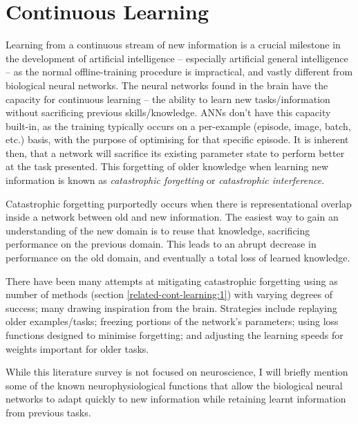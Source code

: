 \documentclass{report}
\begin{document}
	\section{Continuous Learning}
	Learning from a continuous stream of new information is a crucial milestone in the development of artificial intelligence -- especially artificial general intelligence -- as the normal offline-training procedure is impractical, and vastly different from biological neural networks. The neural networks found in the brain have the capacity for continuous learning -- the ability to learn new tasks/information without sacrificing previous skills/knowledge. ANNs don't have this capacity built-in, as the training typically occurs on a per-example (episode, image, batch, etc.) basis, with the purpose of optimising for that specific episode. It is inherent then, that a network will sacrifice its existing parameter state to perform better at the task presented. This forgetting of older knowledge when learning new information is known as \textit{catastrophic forgetting} or \textit{catastrophic interference}. \par
	Catastrophic forgetting purportedly occurs when there is representational overlap inside a network between old and new information. The easiest way to gain an understanding of the new domain is to reuse that knowledge, sacrificing performance on the previous domain. This leads to an abrupt decrease in performance on the old domain, and eventually a total loss of learned knowledge. \par
	There have been many attempts at mitigating catastrophic forgetting using as number of methods (section \ref{related-cont-learning:1}) with varying degrees of success; many drawing inspiration from the brain. Strategies include replaying older examples/tasks; freezing portions of the network's parameters; using loss functions designed to minimise forgetting; and adjusting the learning speeds for weights important for older tasks. \par
	While this literature survey is not focused on neuroscience, I will briefly mention some of the known neurophysiological functions that allow the biological neural networks to adapt quickly to new information while retaining learnt information from previous tasks. \par
\end{document}
